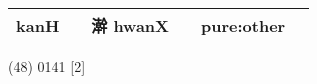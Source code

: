 \documentclass[14pt,a4paper]{scrartcl}
\begin{document}
\begin{longtable}[c]{@{}llllll@{}}
\begin{minipage}[t]{0.14\columnwidth}\raggedright\strut
kanH
\strut\end{minipage} &
\begin{minipage}[t]{0.14\columnwidth}\raggedright\strut
\strut\end{minipage} &
\begin{minipage}[t]{0.14\columnwidth}\raggedright\strut
澣 hwanX
\strut\end{minipage} &
\begin{minipage}[t]{0.14\columnwidth}\raggedright\strut
\strut\end{minipage} &
\begin{minipage}[t]{0.14\columnwidth}\raggedright\strut
pure:other
\strut\end{minipage}\tabularnewline
\bottomrule
\end{longtable}

(48) 0141 {[}2{]}
\end{document}
